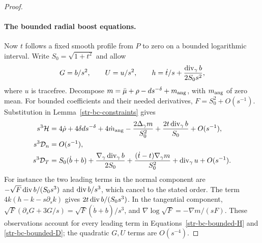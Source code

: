 \begin{proof}
\paragraph{The bounded radial boost equations.}
Now $t$ follows a fixed smooth profile from $P$ to zero on a bounded
logarithmic interval. Write $S_0=\sqrt{1+t^2}$ and allow
\begin{equation}
 G=b/s^2,\qquad U=u/s^2,\qquad
 h=\dot t/s+\frac{\operatorname{div}_\gamma b}{2S_0s^2},
 \label{str-bc-bounded-ansatz}
\end{equation}
where $u$ is tracefree. Decompose $m=\bar\mu+\rho-ds^{-\delta}+m_{\rm ang}$,
with $m_{\rm ang}$ of zero mean. For bounded coefficients and their needed
derivatives, $F=S_0^2+O(s^{-1})$. Substitution in
Lemma~\ref{str-bc-constraints} gives
\begin{align}
 s^3\mathcal H&=4\dot\rho+4\delta ds^{-\delta}
 +4\dot m_{\rm ang}-\frac{2\Delta_\gamma m}{S_0^2}
 +\frac{2t\operatorname{div}_\gamma b}{S_0}+O(s^{-1}),
 \label{str-bc-bounded-H}\\
 s^3\mathcal D_n&=O(s^{-1}),\nonumber\\
 s^3\mathcal D_T&=S_0(\dot b+b)
 +\frac{\nabla_\gamma\operatorname{div}_\gamma b}{2S_0}
 +\frac{(\dot t-t)\nabla_\gamma m}{S_0^2}
 +\operatorname{div}_\gamma u+O(s^{-1}).
 \label{str-bc-bounded-D}
\end{align}
For instance the two leading terms in the normal component are
$-\sqrt F\operatorname{div} b/(S_0s^3)$ and $\operatorname{div} b/s^3$, which cancel to the
stated order. The term $4k(h-k-s\partial_sk)$ gives
$2t\operatorname{div} b/(S_0s^3)$. In the tangential component,
$\sqrt F(\partial_sG+3G/s)=\sqrt F(\dot b+b)/s^3$,
and $\nabla\log\sqrt F=-\nabla m/(sF)$. These observations account for
every leading term in Equations~\eqref{str-bc-bounded-H} and
\eqref{str-bc-bounded-D}; the quadratic $G,U$ terms are $O(s^{-4})$.


\end{proof}
